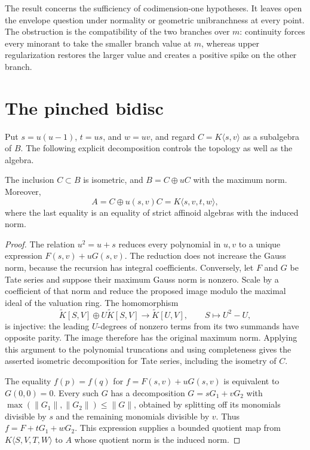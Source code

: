 \documentclass[11pt,a4paper]{amsart}
\begin{document}
The result concerns the sufficiency of codimension-one hypotheses. It leaves open the envelope question under normality or geometric unibranchness at every point. The obstruction is the compatibility of the two branches over $m$: continuity forces every minorant to take the smaller branch value at $m$, whereas upper regularization restores the larger value and creates a positive spike on the other branch.

\section{The pinched bidisc}\label{sec:pinched-bidisc}

Put $s=u(u-1)$, $t=us$, and $w=uv$, and regard $C=K\langle s,v\rangle$ as a subalgebra of $B$. The following explicit decomposition controls the topology as well as the algebra.

\begin{lemma}\label{lem:banach-decomposition}
The inclusion $C\subset B$ is isometric, and $B=C\oplus uC$ with the maximum norm. Moreover,
\[
 A=C\oplus u(s,v)C=K\langle s,v,t,w\rangle,
\]
where the last equality is an equality of strict affinoid algebras with the induced norm.
\end{lemma}

\begin{proof}
The relation $u^2=u+s$ reduces every polynomial in $u,v$ to a unique expression $F(s,v)+uG(s,v)$. The reduction does not increase the Gauss norm, because the recursion has integral coefficients. Conversely, let $F$ and $G$ be Tate series and suppose their maximum Gauss norm is nonzero. Scale by a coefficient of that norm and reduce the proposed image modulo the maximal ideal of the valuation ring. The homomorphism
\[
 \widetilde K[S,V]\oplus U\widetilde K[S,V]\longrightarrow\widetilde K[U,V],\qquad S\longmapsto U^2-U,
\]
is injective: the leading $U$-degrees of nonzero terms from its two summands have opposite parity. The image therefore has the original maximum norm. Applying this argument to the polynomial truncations and using completeness gives the asserted isometric decomposition for Tate series, including the isometry of $C$.

The equality $f(p)=f(q)$ for $f=F(s,v)+uG(s,v)$ is equivalent to $G(0,0)=0$. Every such $G$ has a decomposition $G=sG_1+vG_2$ with $\max(\|G_1\|,\|G_2\|)\leq\|G\|$, obtained by splitting off its monomials divisible by $s$ and the remaining monomials divisible by $v$. Thus $f=F+tG_1+wG_2$. This expression supplies a bounded quotient map from $K\langle S,V,T,W\rangle$ to $A$ whose quotient norm is the induced norm.
\end{proof}
\end{document}
